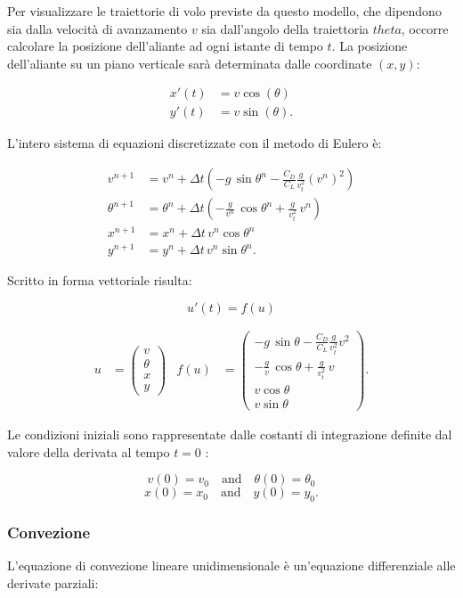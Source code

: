 \noindent
Per visualizzare le traiettorie di volo previste da questo modello, che dipendono sia dalla velocità di avanzamento $v$ sia dall’angolo della traiettoria $theta$, occorre calcolare la posizione dell'aliante ad ogni istante di tempo $t$. La posizione dell’aliante su un piano verticale sarà determinata dalle coordinate $(x,y)$: 

\begin{align}
x'(t) & = v \cos(\theta) \\
y'(t) & = v \sin(\theta).
\end{align}

\noindent
L’intero sistema di equazioni discretizzate con il metodo di Eulero è:

\begin{align}
v^{n+1} & = v^n + \Delta t \left(- g\, \sin\theta^n - \frac{C_D}{C_L} \frac{g}{v_t^2} (v^n)^2 \right) \\
\theta^{n+1} & = \theta^n + \Delta t \left(- \frac{g}{v^n}\,\cos\theta^n + \frac{g}{v_t^2}\, v^n \right) \\
x^{n+1} & = x^n + \Delta t \, v^n \cos\theta^n \\
y^{n+1} & = y^n + \Delta t \, v^n \sin\theta^n.
\end{align}

\noindent
Scritto in forma vettoriale risulta: 

$$u'(t) = f(u)$$

\begin{align}
u & = \begin{pmatrix} v \\ \theta \\ x \\ y \end{pmatrix} & f(u) & = \begin{pmatrix} - g\, \sin\theta - \frac{C_D}{C_L} \frac{g}{v_t^2} v^2 \\ - \frac{g}{v}\,\cos\theta + \frac{g}{v_t^2}\, v \\ v\cos\theta \\ v\sin\theta \end{pmatrix}.
\end{align}

\noindent
Le condizioni iniziali sono rappresentate dalle costanti di integrazione definite dal valore della derivata al tempo $t = 0$ :

$$
v(0) = v_0 \quad \text{and} \quad \theta(0) = \theta_0
$$
$$
x(0) = x_0 \quad \text{and} \quad y(0) = y_0.
$$

\subsubsection*{Convezione}
L’equazione di convezione lineare unidimensionale è un’equazione differenziale alle derivate parziali: 

